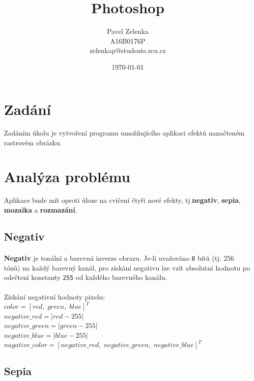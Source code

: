 \documentclass[12pt]{scrartcl}
\author{Pavel Zelenka\\A16B0176P\\zelenkap@students.zcu.cz}
\date{\today}
\title{Photoshop}
\begin{document}
\maketitle
{}
\newpage
{}
\newpage
\section{Zadání}
	
\paragraph{}
Zadáním úkolu je vytvoření programu umožňujícího aplikaci efektů na\nobreakspace načteném rastrovém obrázku. 

\section{Analýza problému}
\paragraph{}
Aplikace bude mít oproti úloze na cvičení čtyři nové efekty, tj.\nobreakspace \textbf{negativ}, \textbf{sepia}, \textbf{mozaika} a \textbf{rozmazání}.

\subsection{Negativ}
\paragraph{}
\textbf{Negativ} je tonální a barevná inverze obrazu. Je-li uvažováno \texttt{8} bitů (tj. 256 tónů) na každý barevný kanál, pro získání negativu lze vzít absolutní hodnotu po odečtení konstanty \texttt{255} od každého barevného kanálu.\\\\
Získání negativní hodnoty pixelu: \\
$color = [red,\; green,\; blue]^T $ \\
$negative\_red = |red-255| $ \\
$negative\_green = |green-255| $ \\
$negative\_blue = |blue-255| $ \\
$nagative\_color = [negative\_ red,\; negative\_green,\; negative\_blue]^T $

\subsection{Sepia}
\end{document}
